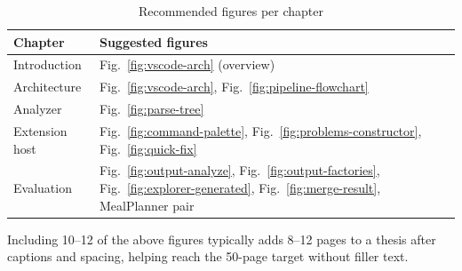 \begin{table}[htbp]
\centering
\caption{Recommended figures per chapter}
\label{tab:figure-map}
\begin{tabular}{|l|l|}
\hline
\textbf{Chapter} & \textbf{Suggested figures} \\
\hline
Introduction & Fig.~\ref{fig:vscode-arch} (overview) \\
\hline
Architecture & Fig.~\ref{fig:vscode-arch}, Fig.~\ref{fig:pipeline-flowchart} \\
\hline
Analyzer & Fig.~\ref{fig:parse-tree} \\
\hline
Extension host & Fig.~\ref{fig:command-palette}, Fig.~\ref{fig:problems-constructor}, Fig.~\ref{fig:quick-fix} \\
\hline
Evaluation & Fig.~\ref{fig:output-analyze}, Fig.~\ref{fig:output-factories}, Fig.~\ref{fig:explorer-generated}, Fig.~\ref{fig:merge-result}, MealPlanner pair \\
\hline
\end{tabular}
\end{table}

Including 10--12 of the above figures typically adds 8--12 pages to a thesis after captions and spacing, helping reach the 50-page target without filler text.

